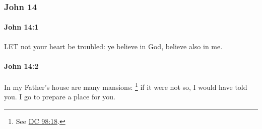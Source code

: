 	\subsubsection{John 14} %
		\label{JOHN-14}
		
		\paragraph{John 14:1} %
			\label{JOHN-14-1}

			LET not your heart be troubled: ye believe in God, believe also in me.

			\begin{framed}
				\scriptsize
				\begin{compactdesc}
					\item[SBLG] 
				\end{compactdesc}
			\end{framed}

		\paragraph{John 14:2} %
			\label{JOHN-14-2}

			In my Father's house are many mansions:%
				\footnote{%
					See \hyperref[DC98-18]{DC 98:18}.
					} 
			if it were not so, I would have told you. I go to prepare a place for you.

